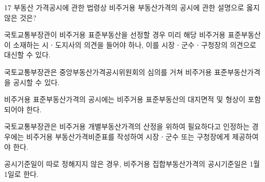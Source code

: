 \begin{question}{17}
부동산 가격공시에 관한 법령상 비주거용 부동산가격의 공시에 관한 설명으로 옳지 않은 것은?
\begin{choices}
  \item 국토교통부장관이 비주거용 표준부동산을 선정할 경우 미리 해당 비주거용 표준부동산이 소재하는 시ㆍ도지사의 의견을 들어야 하나, 이를 시장ㆍ군수ㆍ구청장의 의견으로 대신할 수 있다.
  \item 국토교통부장관은 중앙부동산가격공시위원회의 심의를 거쳐 비주거용 표준부동산가격을 공시할 수 있다.
  \item 비주거용 표준부동산가격의 공시에는 비주거용 표준부동산의 대지면적 및 형상이 포함되어야 한다.
  \item 국토교통부장관은 비주거용 개별부동산가격의 산정을 위하여 필요하다고 인정하는 경우에는 비주거용 부동산가격비준표를 작성하여 시장ㆍ군수 또는 구청장에게 제공하여야 한다.
  \item 공시기준일이 따로 정해지지 않은 경우, 비주거용 집합부동산가격의 공시기준일은 1월 1일로 한다.
\end{choices}
\end{question}
